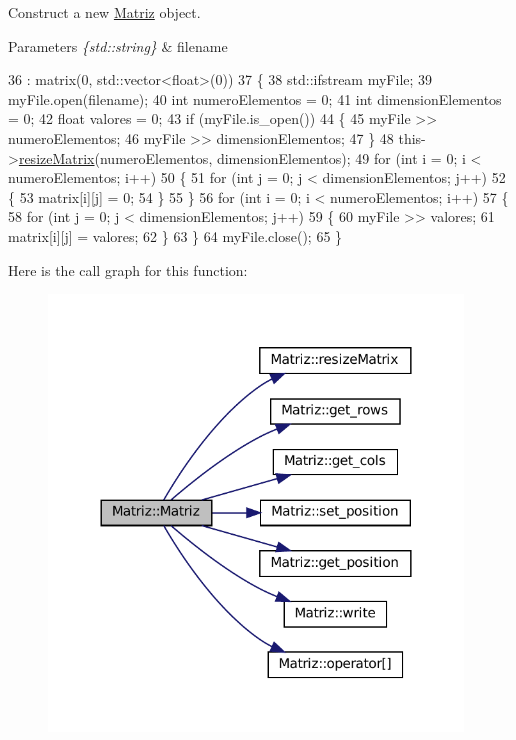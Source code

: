 Construct a new \hyperlink{classMatriz}{Matriz} object. 


\begin{DoxyParams}{Parameters}
{\em \{std\+::string\}} & filename \\
\hline
\end{DoxyParams}

\begin{DoxyCode}
36                              : matrix(0, std::vector<float>(0))
37   \{
38     std::ifstream myFile;
39     myFile.open(filename);
40     \textcolor{keywordtype}{int} numeroElementos = 0;
41     \textcolor{keywordtype}{int} dimensionElementos = 0;
42     \textcolor{keywordtype}{float} valores = 0;
43     \textcolor{keywordflow}{if} (myFile.is\_open())
44     \{
45       myFile >> numeroElementos;
46       myFile >> dimensionElementos;
47     \}
48     this->\hyperlink{classMatriz_aa929f933e9088dc0efecaa9a46d555d9}{resizeMatrix}(numeroElementos, dimensionElementos);
49     \textcolor{keywordflow}{for} (\textcolor{keywordtype}{int} i = 0; i < numeroElementos; i++)
50     \{
51       \textcolor{keywordflow}{for} (\textcolor{keywordtype}{int} j = 0; j < dimensionElementos; j++)
52       \{
53         matrix[i][j] = 0;
54       \}
55     \}
56     \textcolor{keywordflow}{for} (\textcolor{keywordtype}{int} i = 0; i < numeroElementos; i++)
57     \{
58       \textcolor{keywordflow}{for} (\textcolor{keywordtype}{int} j = 0; j < dimensionElementos; j++)
59       \{
60           myFile >> valores;
61           matrix[i][j] = valores;
62       \}
63     \}
64     myFile.close();
65   \}
\end{DoxyCode}
Here is the call graph for this function\+:
\nopagebreak
\begin{figure}[H]
\begin{center}
\leavevmode
\includegraphics[width=312pt]{classMatriz_a388709cfee356a0c78b66e3f538e9318_cgraph}
\end{center}
\end{figure}


